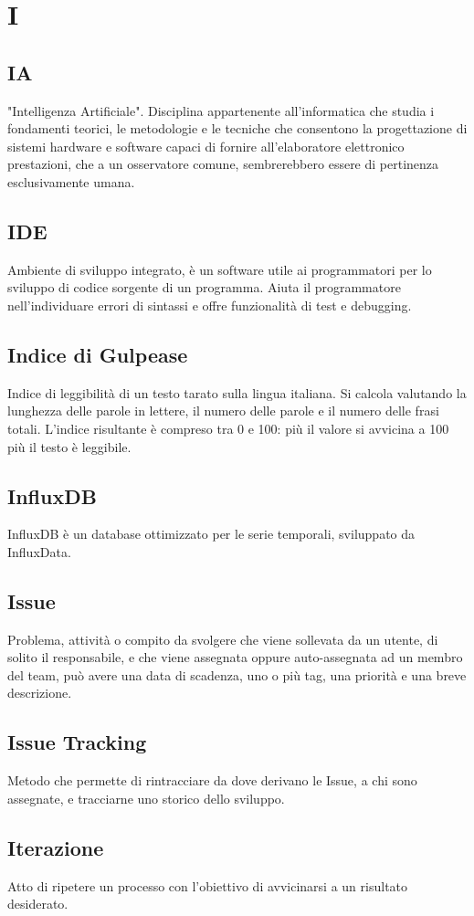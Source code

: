 \section*{I}

\subsection{IA}
"Intelligenza Artificiale". Disciplina appartenente all'informatica che studia i fondamenti teorici, le metodologie e le tecniche che consentono la progettazione di sistemi hardware e software
capaci di fornire all'elaboratore elettronico prestazioni, che a un osservatore comune, sembrerebbero essere di pertinenza esclusivamente umana. 

\subsection{IDE}
Ambiente di sviluppo integrato, è un software utile ai programmatori per lo sviluppo di codice sorgente di un programma. Aiuta il programmatore nell'individuare errori di sintassi e offre funzionalità di test e debugging.

\subsection{Indice di Gulpease}
Indice di leggibilità di un testo tarato sulla lingua italiana. Si calcola valutando la lunghezza delle parole in lettere, il numero delle parole e il numero delle frasi totali. L'indice risultante è compreso tra 0 e 100: più il valore si avvicina a 100 più il testo è leggibile.

\subsection{InfluxDB}
InfluxDB è un database ottimizzato per le serie temporali, sviluppato da InfluxData.

\subsection{Issue}
Problema, attività o compito da svolgere che viene sollevata da un utente, di solito il responsabile, e che viene assegnata oppure auto-assegnata ad un membro del team, può avere una data di scadenza, uno o più tag, una priorità e una breve descrizione.

\subsection{Issue Tracking}
Metodo che permette di rintracciare da dove derivano le Issue, a chi sono assegnate, e tracciarne uno storico dello sviluppo.

\subsection{Iterazione}
Atto di ripetere un processo con l'obiettivo di avvicinarsi a un risultato desiderato.

